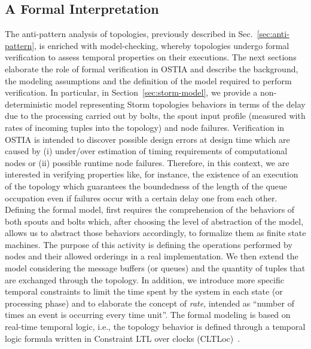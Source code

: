 \subsection{A Formal Interpretation}
The anti-pattern analysis of topologies, previously described in Sec.~\ref{sec:anti-pattern}, is enriched with model-checking, whereby topologies undergo formal verification to assess temporal properties on their executions.
The next sections elaborate the role of formal verification in OSTIA and describe the background, the modeling assumptions and the definition of the model required to perform verification.
In particular, in Section~\ref{sec:storm-model}, we provide a non-deterministic model representing Storm topologies behaviors in terms of the delay due to the processing carried out by bolts, the spout input profile (measured with rates of incoming tuples into the topology) and node failures.
Verification in OSTIA is intended to discover possible design errors at design time which are caused by (i) under/over estimation of timing requirements of computational nodes or (ii) possible runtime node failures.
Therefore, in this context, we are interested in verifying properties like, for instance, the existence of an execution of the topology which guarantees the boundedness of the length of the queue occupation even if failures occur with a certain delay one from each other.
Defining the formal model, first requires the comprehension of %
the behaviors of both spouts and bolts which, after choosing the level of abstraction of the model, allows us to abstract those behaviors accordingly, %
to formalize them as finite state machines. The purpose of this  activity is defining the %
operations performed by nodes and their allowed orderings in a real implementation. %
We then extend the model %
considering the message buffers (or queues) and the quantity of tuples that are exchanged through the topology.
In addition, %
we introduce more specific temporal constraints %
to limit the time spent by the system in each state (or processing phase) and to elaborate the concept of \textit{rate}, intended as ``number of times an event is occurring every time unit''.
The formal modeling is based on real-time temporal logic, i.e., the topology behavior is defined through a temporal logic formula written in Constraint LTL over clocks (CLTLoc)~\cite{BRS15}.



